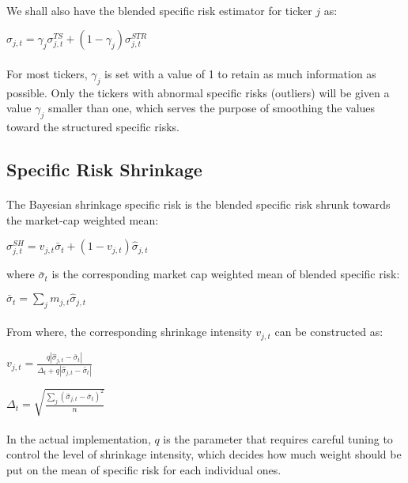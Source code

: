 \documentclass{article}
\begin{document}
\paragraph{}We shall also have the blended specific risk estimator for ticker $j$ as:
\begin{center}
    $\hat{\sigma}_{j,t} = \gamma_{j} \sigma_{j,t}^{TS} + (1-\gamma_{j}) \sigma_{j,t}^{STR}$
\end{center}
\paragraph{}For most tickers, $\gamma_{j}$ is set with a value of 1 to retain as much information as possible. Only the tickers with abnormal specific risks (outliers) will be given a value $\gamma_{j}$ smaller than one, which serves the purpose of smoothing the values toward the structured specific risks.
\subsection{Specific Risk Shrinkage}
\paragraph{}The Bayesian shrinkage specific risk is the blended specific risk shrunk towards the market-cap weighted mean: \\
\begin{center}
    $\sigma_{j,t}^{SH} = v_{j,t}\bar{\sigma}_{t} + (1-v_{j,t}) \hat{\sigma}_{j,t}$
\end{center}
where $\bar{\sigma}_{t}$ is the corresponding market cap weighted mean of blended specific risk:
\begin{center}
    $\bar{\sigma}_{t} = \sum\limits_{j} m_{j,t}\hat{\sigma}_{j,t} $
\end{center}
\paragraph{}From where, the corresponding shrinkage intensity $v_{j,t}$ can be constructed as:
\begin{center}
    $v_{j,t} = \frac{q | \hat{\sigma}_{j,t} - \bar{\sigma}_{t}|}{\Delta_{t} +q | \hat{\sigma}_{j,t} - \bar{\sigma}_{t}|}$ \\
\end{center}
\begin{center}
    $\Delta_{t} = \sqrt{\frac{\sum\limits_{j}(\hat{\sigma}_{j,t} - \bar{\sigma}_{t})^{2}}{n}}$
\end{center}
\paragraph{}In the actual implementation, $q$ is the parameter that requires careful tuning to control the level of shrinkage intensity, which decides how much weight should be put on the mean of specific risk for each individual ones.
\end{document}
